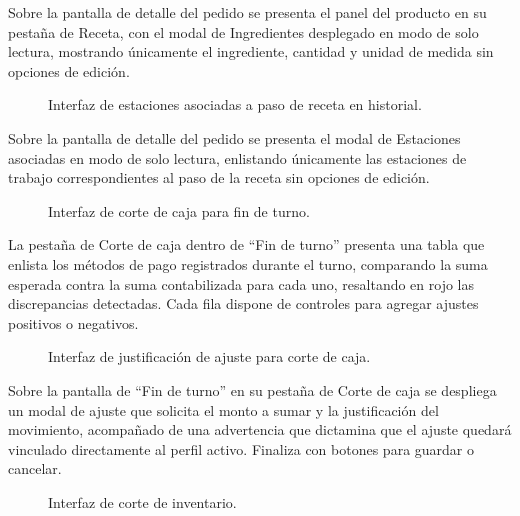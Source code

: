 Sobre la pantalla de detalle del pedido se presenta el panel del producto en su pestaña de Receta, con el modal de Ingredientes desplegado en modo de solo lectura, mostrando únicamente el ingrediente, cantidad y unidad de medida sin opciones de edición.

\begin{figure}[H]
    \centering
    
    \caption{Interfaz de estaciones asociadas a paso de receta en historial.}
    \label{fig:ui-caj-20-b}
\end{figure}

Sobre la pantalla de detalle del pedido se presenta el modal de Estaciones asociadas en modo de solo lectura, enlistando únicamente las estaciones de trabajo correspondientes al paso de la receta sin opciones de edición.

\begin{figure}[H]
    \centering
    
    \caption{Interfaz de corte de caja para fin de turno.}
    \label{fig:ui-caj-22}
\end{figure}

La pestaña de Corte de caja dentro de ``Fin de turno'' presenta una tabla que enlista los métodos de pago registrados durante el turno, comparando la suma esperada contra la suma contabilizada para cada uno, resaltando en rojo las discrepancias detectadas. Cada fila dispone de controles para agregar ajustes positivos o negativos.

\begin{figure}[H]
    \centering
    
    \caption{Interfaz de justificación de ajuste para corte de caja.}
    \label{fig:ui-caj-22-a}
\end{figure}

Sobre la pantalla de ``Fin de turno'' en su pestaña de Corte de caja se despliega un modal de ajuste que solicita el monto a sumar y la justificación del movimiento, acompañado de una advertencia que dictamina que el ajuste quedará vinculado directamente al perfil activo. Finaliza con botones para guardar o cancelar.

\begin{figure}[H]
    \centering
    
    \caption{Interfaz de corte de inventario.}
    \label{fig:ui-caj-23}
\end{figure}


